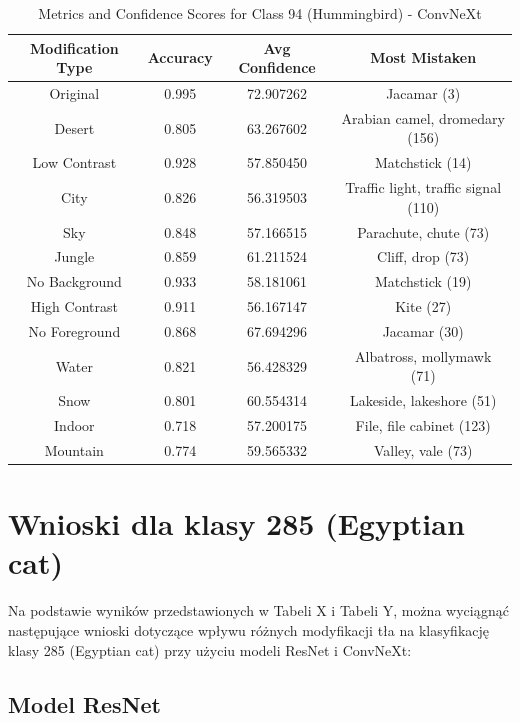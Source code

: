 \begin{table}
	\centering
	\begin{tabular}{|c|c|c|c|}
		\hline
		\textbf{Modification Type} & \textbf{Accuracy} & \textbf{Avg Confidence} & \textbf{Most Mistaken} \\
		\hline
		Original & 0.995 & 72.907262 & Jacamar (3) \\
		\hline
		Desert & 0.805 & 63.267602 & Arabian camel, dromedary (156) \\
		\hline
		Low Contrast & 0.928 & 57.850450 & Matchstick (14) \\
		\hline
		City & 0.826 & 56.319503 & Traffic light, traffic signal (110) \\
		\hline
		Sky & 0.848 & 57.166515 & Parachute, chute (73) \\
		\hline
		Jungle & 0.859 & 61.211524 & Cliff, drop (73) \\
		\hline
		No Background & 0.933 & 58.181061 & Matchstick (19) \\
		\hline
		High Contrast & 0.911 & 56.167147 & Kite (27) \\
		\hline
		No Foreground & 0.868 & 67.694296 & Jacamar (30) \\
		\hline
		Water & 0.821 & 56.428329 & Albatross, mollymawk (71) \\
		\hline
		Snow & 0.801 & 60.554314 & Lakeside, lakeshore (51) \\
		\hline
		Indoor & 0.718 & 57.200175 & File, file cabinet (123) \\
		\hline
		Mountain & 0.774 & 59.565332 & Valley, vale (73) \\
		\hline
	\end{tabular}
	\caption{Metrics and Confidence Scores for Class 94 (Hummingbird) - ConvNeXt}
	\label{tab:metrics_confidence_class_94_convnext}
\end{table}

\section*{Wnioski dla klasy 285 (Egyptian cat)}

Na podstawie wyników przedstawionych w Tabeli X i Tabeli Y, można wyciągnąć następujące wnioski dotyczące wpływu różnych modyfikacji tła na klasyfikację klasy 285 (Egyptian cat) przy użyciu modeli ResNet i ConvNeXt:

\subsection*{Model ResNet}

